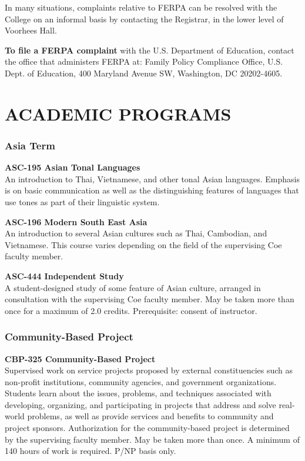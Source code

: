 \documentclass[
  letterpaper,
]{scrbook}
\renewcommand{\part}[1]{\addcontentsline{toc}{part}{#1}}
\begin{document}
In many situations, complaints relative to FERPA can be resolved with
the College on an informal basis by contacting the Registrar, in the
lower level of Voorhees Hall.

\textbf{To file a FERPA complaint} with the U.S. Department of
Education, contact the office that administers FERPA at: Family Policy
Compliance Office, U.S. Dept. of Education, 400 Maryland Avenue SW,
Washington, DC 20202-4605.

\part{COURSES OF INSTRUCTION}

\chapter{ACADEMIC PROGRAMS}\label{sec-academic-programs}

\subsection{Asia Term}\label{sec-academic-programs-asia-term}

\textbf{ASC-195 Asian Tonal Languages}\\
An introduction to Thai, Vietnamese, and other tonal Asian languages.
Emphasis is on basic communication as well as the distinguishing
features of languages that use tones as part of their linguistic system.

\textbf{ASC-196 Modern South East Asia}\\
An introduction to several Asian cultures such as Thai, Cambodian, and
Vietnamese. This course varies depending on the field of the supervising
Coe faculty member.

\textbf{ASC-444 Independent Study}\\
A student-designed study of some feature of Asian culture, arranged in
consultation with the supervising Coe faculty member. May be taken more
than once for a maximum of 2.0 credits. Prerequisite: consent of
instructor.

\subsection{Community-Based Project}\label{sec-community-based-project}

\textbf{CBP-325 Community-Based Project}\\
Supervised work on service projects proposed by external constituencies
such as non-profit institutions, community agencies, and government
organizations. Students learn about the issues, problems, and techniques
associated with developing, organizing, and participating in projects
that address and solve real-world problems, as well as provide services
and benefits to community and project sponsors. Authorization for the
community-based project is determined by the supervising faculty member.
May be taken more than once. A minimum of 140 hours of work is required.
P/NP basis only.
\end{document}
